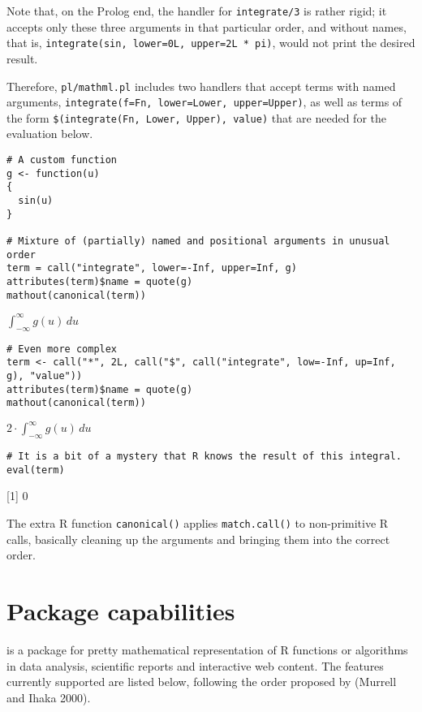 Note that, on the Prolog end, the handler for \texttt{integrate/3} is rather rigid; it
accepts only these three arguments in that particular order, and without names,
that is, \texttt{integrate(sin,\ lower=0L,\ upper=2L\ *\ pi)}, would not print the desired
result.

Therefore, \texttt{pl/mathml.pl} includes two handlers that accept terms with named
arguments, \texttt{integrate(f=Fn,\ lower=Lower,\ upper=Upper)}, as well as terms of the
form \texttt{\$(integrate(Fn,\ Lower,\ Upper),\ value)} that are needed for the evaluation
below.

\begin{verbatim}
# A custom function
g <- function(u)
{
  sin(u)
}

# Mixture of (partially) named and positional arguments in unusual order
term = call("integrate", lower=-Inf, upper=Inf, g)
attributes(term)$name = quote(g)
mathout(canonical(term))
\end{verbatim}

\(\int_{{-\infty}}^{\infty}{{{g}\left({u}\right)}}\,{d{u}}\)

\begin{verbatim}
# Even more complex
term <- call("*", 2L, call("$", call("integrate", low=-Inf, up=Inf, g), "value"))
attributes(term)$name = quote(g)
mathout(canonical(term))
\end{verbatim}

\({{2}\cdot\int_{{-\infty}}^{\infty}{{{g}\left({u}\right)}}\,{d{u}}}\)

\begin{verbatim}
# It is a bit of a mystery that R knows the result of this integral.
eval(term)
\end{verbatim}

{[}1{]} 0

The extra R function \texttt{canonical()} applies \texttt{match.call()} to non-primitive R
calls, basically cleaning up the arguments and bringing them into the correct
order.

\hypertarget{package-capabilities}{%
\section{Package capabilities}\label{package-capabilities}}

 is a package for pretty mathematical representation of R functions or algorithms in data analysis, scientific reports and interactive web content. The features currently supported are listed below, following the order proposed by (Murrell and Ihaka 2000).

